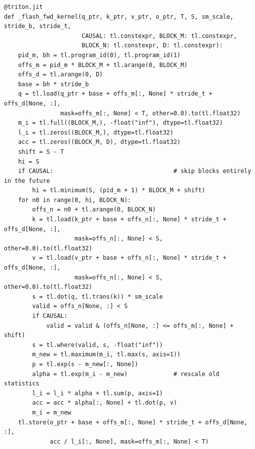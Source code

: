 \begin{lstlisting}[caption={FlashAttention forward kernel: one program per (query block,
batch$\times$head).},label={lst:triton:flash}]
@triton.jit
def _flash_fwd_kernel(q_ptr, k_ptr, v_ptr, o_ptr, T, S, sm_scale, stride_b, stride_t,
                      CAUSAL: tl.constexpr, BLOCK_M: tl.constexpr,
                      BLOCK_N: tl.constexpr, D: tl.constexpr):
    pid_m, bh = tl.program_id(0), tl.program_id(1)
    offs_m = pid_m * BLOCK_M + tl.arange(0, BLOCK_M)
    offs_d = tl.arange(0, D)
    base = bh * stride_b
    q = tl.load(q_ptr + base + offs_m[:, None] * stride_t + offs_d[None, :],
                mask=offs_m[:, None] < T, other=0.0).to(tl.float32)
    m_i = tl.full((BLOCK_M,), -float("inf"), dtype=tl.float32)
    l_i = tl.zeros((BLOCK_M,), dtype=tl.float32)
    acc = tl.zeros((BLOCK_M, D), dtype=tl.float32)
    shift = S - T
    hi = S
    if CAUSAL:                                  # skip blocks entirely in the future
        hi = tl.minimum(S, (pid_m + 1) * BLOCK_M + shift)
    for n0 in range(0, hi, BLOCK_N):
        offs_n = n0 + tl.arange(0, BLOCK_N)
        k = tl.load(k_ptr + base + offs_n[:, None] * stride_t + offs_d[None, :],
                    mask=offs_n[:, None] < S, other=0.0).to(tl.float32)
        v = tl.load(v_ptr + base + offs_n[:, None] * stride_t + offs_d[None, :],
                    mask=offs_n[:, None] < S, other=0.0).to(tl.float32)
        s = tl.dot(q, tl.trans(k)) * sm_scale
        valid = offs_n[None, :] < S
        if CAUSAL:
            valid = valid & (offs_n[None, :] <= offs_m[:, None] + shift)
        s = tl.where(valid, s, -float("inf"))
        m_new = tl.maximum(m_i, tl.max(s, axis=1))
        p = tl.exp(s - m_new[:, None])
        alpha = tl.exp(m_i - m_new)             # rescale old statistics
        l_i = l_i * alpha + tl.sum(p, axis=1)
        acc = acc * alpha[:, None] + tl.dot(p, v)
        m_i = m_new
    tl.store(o_ptr + base + offs_m[:, None] * stride_t + offs_d[None, :],
             acc / l_i[:, None], mask=offs_m[:, None] < T)
\end{lstlisting}

